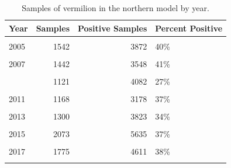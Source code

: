 \documentclass[
  english,
  a4paper,
]{article}
\begin{document}
\begin{table}

\caption{\label{tab:tab-year-crfspr}Samples of vermilion in the northern model by year.}
\centering
\begin{tabular}[t]{lrrl}
\toprule
Year & Samples & Positive Samples & Percent Positive\\
\midrule
\cellcolor{gray!6}{2004} & \cellcolor{gray!6}{1236} & \cellcolor{gray!6}{2833} & \cellcolor{gray!6}{44\%}\\
2005 & 1542 & 3872 & 40\%\\
\cellcolor{gray!6}{2006} & \cellcolor{gray!6}{2109} & \cellcolor{gray!6}{4932} & \cellcolor{gray!6}{43\%}\\
2007 & 1442 & 3548 & 41\%\\
\cellcolor{gray!6}{2008} & \cellcolor{gray!6}{1104} & \cellcolor{gray!6}{3691} & \cellcolor{gray!6}{30\%}\\
\addlinespace
2009 & 1121 & 4082 & 27\%\\
\cellcolor{gray!6}{2010} & \cellcolor{gray!6}{969} & \cellcolor{gray!6}{2682} & \cellcolor{gray!6}{36\%}\\
2011 & 1168 & 3178 & 37\%\\
\cellcolor{gray!6}{2012} & \cellcolor{gray!6}{1023} & \cellcolor{gray!6}{3126} & \cellcolor{gray!6}{33\%}\\
2013 & 1300 & 3823 & 34\%\\
\addlinespace
\cellcolor{gray!6}{2014} & \cellcolor{gray!6}{1434} & \cellcolor{gray!6}{4570} & \cellcolor{gray!6}{31\%}\\
2015 & 2073 & 5635 & 37\%\\
\cellcolor{gray!6}{2016} & \cellcolor{gray!6}{1810} & \cellcolor{gray!6}{4812} & \cellcolor{gray!6}{38\%}\\
2017 & 1775 & 4611 & 38\%\\
\cellcolor{gray!6}{2018} & \cellcolor{gray!6}{1865} & \cellcolor{gray!6}{4442} & \cellcolor{gray!6}{42\%}\\
\bottomrule
\end{tabular}
\end{table}

\FloatBarrier
\end{document}
